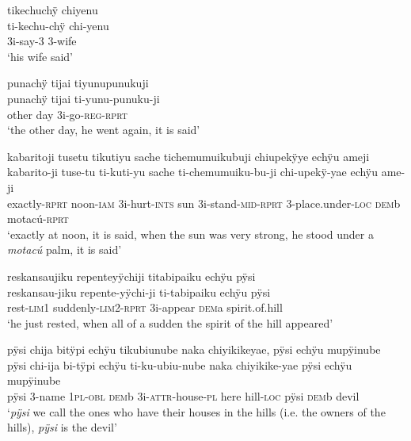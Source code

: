 \ea%
\begingl 
\glpreamble tikechuchÿ chiyenu\\
\gla ti-kechu-chÿ chi-yenu\\ 
\glb 3i-say-3 3-wife\\ 
\glft ‘his wife said’\\ 
\endgl
\xe


\ea%
\begingl 
\glpreamble punachÿ tijai tiyunupunukuji\\
\gla punachÿ tijai ti-yunu-punuku-ji\\ 
\glb other day 3i-go-\textsc{reg}-\textsc{rprt}\\ 
\glft ‘the other day, he went again, it is said’\\ 
\endgl
\xe

\ea%
\begingl 
\glpreamble kabaritoji tusetu tikutiyu sache tichemumuikubuji chiupekÿye echÿu ameji\\
\gla kabarito-ji tuse-tu ti-kuti-yu sache ti-chemumuiku-bu-ji chi-upekÿ-yae echÿu ame-ji\\ 
\glb exactly-\textsc{rprt} noon-\textsc{iam} 3i-hurt-\textsc{ints} sun 3i-stand-\textsc{mid}-\textsc{rprt} 3-place.under-\textsc{loc} \textsc{dem}b motacú-\textsc{rprt}\\ 
\glft ‘exactly at noon, it is said, when the sun was very strong, he stood under a \textit{motacú} palm, it is said’\\ 
\endgl
\xe

\ea%
\begingl 
\glpreamble reskansaujiku repenteyÿchiji titabipaiku echÿu pÿsi\\
\gla reskansau-jiku repente-yÿchi-ji ti-tabipaiku echÿu pÿsi\\ 
\glb rest-\textsc{lim}1 suddenly-\textsc{lim}2-\textsc{rprt} 3i-appear \textsc{dem}a spirit.of.hill\\ 
\glft ‘he just rested, when all of a sudden the spirit of the hill appeared’\\ 
\endgl
\xe


\ea%
\begingl
\glpreamble pÿsi chija bitÿpi echÿu tikubiunube naka chiyikikeyae, pÿsi echÿu mupÿinube\\
\gla pÿsi chi-ija bi-tÿpi echÿu ti-ku-ubiu-nube naka chiyikike-yae pÿsi echÿu mupÿinube\\
\glb pÿsi 3-name 1\textsc{pl}-\textsc{obl} \textsc{dem}b 3i-\textsc{attr}-house-\textsc{pl} here hill-\textsc{loc} pÿsi \textsc{dem}b devil\\
\glft ‘\textit{pÿsi} we call the ones who have their houses in the hills (i.e. the owners of the hills), \textit{pÿsi} is the devil’
\endgl
\xe

